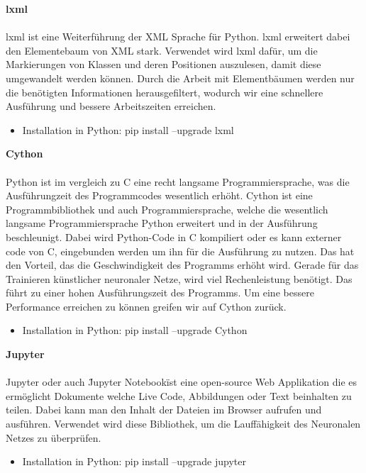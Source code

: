 \documentclass[a4paper,12pt,oneside]{article}
\begin{document}
\textbf{lxml}\\\\ 
lxml ist eine Weiterführung der XML Sprache für Python. lxml erweitert dabei den Elementebaum von XML stark. Verwendet wird lxml dafür, um die Markierungen von Klassen und deren Positionen auszulesen, damit diese umgewandelt werden können. Durch die Arbeit mit Elementbäumen werden nur die benötigten Informationen herausgefiltert, wodurch wir eine schnellere Ausführung und bessere Arbeitszeiten erreichen.
  
  \begin{itemize}
\item Installation in Python: pip install --upgrade lxml
  \end{itemize}
  
  
\textbf{Cython}\\\\
Python ist im vergleich zu C eine recht langsame Programmiersprache, was die Ausführungzeit des Programmcodes wesentlich erhöht. Cython ist eine Programmbibliothek und auch Programmiersprache, welche die wesentlich langsame Programmiersprache Python erweitert und in der Ausführung beschleunigt. Dabei wird Python-Code in C kompiliert oder es kann externer code von C, eingebunden werden um ihn für die Ausführung zu nutzen. Das hat den Vorteil, das die Geschwindigkeit des Programms erhöht wird. Gerade für das Trainieren künstlicher neuronaler Netze, wird viel Rechenleistung benötigt. Das führt zu einer hohen Ausführungszeit des Programms. Um eine bessere Performance erreichen zu können greifen wir auf Cython zurück.

  \begin{itemize}
\item Installation in Python: pip install --upgrade Cython
  \end{itemize}

\textbf{Jupyter}\\\\
Jupyter oder auch \"Jupyter Notebook\" ist eine open-source Web Applikation die es ermöglicht Dokumente welche Live Code, Abbildungen oder Text beinhalten zu teilen. Dabei kann man den Inhalt der Dateien im Browser aufrufen und ausführen. Verwendet wird diese Bibliothek, um die Lauffähigkeit des Neuronalen Netzes zu überprüfen.  

\begin{itemize}
\item Installation in Python: pip install --upgrade jupyter
  \end{itemize}
  
\end{document}
